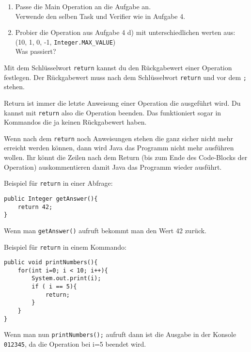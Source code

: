 
\begin{enumerate}
	\item
		Passe die Main Operation an die Aufgabe an.\\
		Verwende den selben Task und Verifier wie in Aufgabe 4.

	\item
		Probier die Operation aus Aufgabe 4 d) mit unterschiedlichen werten aus: (10, 1, 0, -1, \lstinline{Integer.MAX_VALUE}) \\
		Was passiert?
\end{enumerate}

	
\begin{Infobox}[Return]
	Mit dem Schlüsselwort \lstinline{return} kannst du den Rückgabewert einer Operation festlegen.
	Der Rückgabewert muss nach dem Schlüsselwort \lstinline{return} und vor dem \lstinline{;} stehen.

	Return ist immer die letzte Anweisung einer Operation die ausgeführt wird.
	Du kannst mit \lstinline{return} also die Operation beenden.
	Das funktioniert sogar in Kommandos die ja keinen Rückgabewert haben.

	Wenn nach dem \lstinline{return} noch Anweisungen stehen die ganz sicher nicht mehr erreicht werden können, dann wird Java das Programm nicht mehr ausführen wollen.
	Ihr könnt die Zeilen nach dem Return (bis zum Ende des Code-Blocks der Operation) auskommentieren damit Java das Programm wieder ausführt.

	Beispiel für \lstinline{return} in einer Abfrage:
	
	\begin{lstlisting}[xleftmargin=0.5cm]
public Integer getAnswer(){
    return 42;
}
	\end{lstlisting}

	Wenn man \lstinline{getAnswer()} aufruft bekommt man den Wert 42 zurück.

	Beispiel für \lstinline{return} in einem Kommando:

	\begin{lstlisting}[xleftmargin=0.5cm]
public void printNumbers(){
    for(int i=0; i < 10; i++){
        System.out.print(i);
        if ( i == 5){
            return;
        }
    }
}
	\end{lstlisting}

	Wenn man nun \lstinline{printNumbers();} aufruft dann ist die Ausgabe in der Konsole \lstinline{012345}, da die Operation bei i=5 beendet wird.
\end{Infobox}


